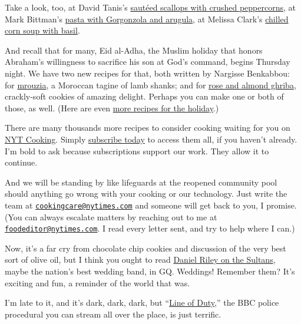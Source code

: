 Take a look, too, at David Tanis's
\href{https://cooking.nytimes.com/recipes/1019844-sauteed-scallops-with-crushed-peppercorns}{sautéed
scallops with crushed peppercorns}, at Mark Bittman's
\href{https://cooking.nytimes.com/recipes/11380-pasta-with-gorgonzola-and-arugula}{pasta
with Gorgonzola and arugula}, at Melissa Clark's
\href{https://cooking.nytimes.com/recipes/1016659-chilled-corn-soup-with-basil}{chilled
corn soup with basil}.

And recall that for many, Eid al-Adha, the Muslim holiday that honors
Abraham's willingness to sacrifice his son at God's command, begins
Thursday night. We have two new recipes for that, both written by
Nargisse Benkabbou: for
\href{https://cooking.nytimes.com/recipes/1021280-mrouzia-lamb-shanks}{mrouzia},
a Moroccan tagine of lamb shanks; and for
\href{https://cooking.nytimes.com/recipes/1021279-rose-and-almond-ghriba}{rose
and almond ghriba}, crackly-soft cookies of amazing delight. Perhaps you
can make one or both of those, as well. (Here are even
\href{https://cooking.nytimes.com/68861692-nyt-cooking/1688528-what-to-cook-for-eid-al-adha}{more
recipes for the holiday}.)

There are many thousands more recipes to consider cooking waiting for
you on \href{https://cooking.nytimes.com/}{NYT Cooking}. Simply
\href{https://www.nytimes.com/subscription/cooking.html?campaignId=6XQHR}{subscribe
today} to access them all, if you haven't already. I'm bold to ask
because subscriptions support our work. They allow it to continue.

And we will be standing by like lifeguards at the reopened community
pool should anything go wrong with your cooking or our technology. Just
write the team at
\href{mailto:cookingcare@nytimes.com}{\nolinkurl{cookingcare@nytimes.com}}
and someone will get back to you, I promise. (You can always escalate
matters by reaching out to me at
\href{mailto:foodeditor@nytimes.com}{\nolinkurl{foodeditor@nytimes.com}}.
I read every letter sent, and try to help where I can.)

Now, it's a far cry from chocolate chip cookies and discussion of the
very best sort of olive oil, but I think you ought to read
\href{https://www.gq.com/story/americas-best-wedding-band-the-sultans}{Daniel
Riley on the Sultans}, maybe the nation's best wedding band, in GQ.
Weddings! Remember them? It's exciting and fun, a reminder of the world
that was.

I'm late to it, and it's dark, dark, dark, but
``\href{https://www.imdb.com/title/tt2303687/}{Line of Duty},'' the BBC
police procedural you can stream all over the place, is just terrific.

